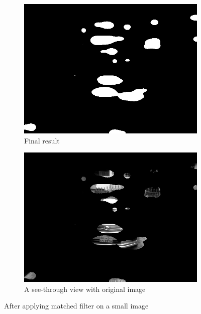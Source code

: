 \begin{figure}
\begin{subfigure}{0.5\textwidth}
    \centering
    \includegraphics[width=0.9\linewidth]{./img/experiment/stage.6/small}
    \caption{Final result}
\end{subfigure}
\begin{subfigure}{0.5\textwidth}
    \centering
    \includegraphics[width=0.9\linewidth]{./img/experiment/stage.6/-3-small}
    \caption{A see-through view with original image}
\end{subfigure}
\caption{After applying matched filter on a small image}
\label{fig:MatchedResult2}
\end{figure}



